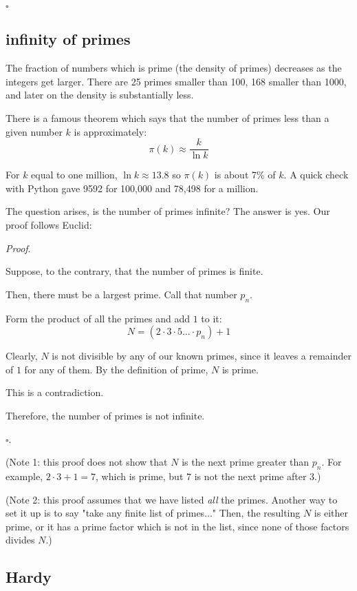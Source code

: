 \documentclass[11pt, oneside]{article}
\begin{document}
$\square$

\subsection*{infinity of primes}

The fraction of numbers which is prime (the density of primes) decreases as the integers get larger.  There are 25 primes smaller than 100, 168 smaller than 1000, and later on the density is substantially less.  

There is a famous theorem which says that the number of primes less than a given number $k$ is approximately:
\[ \pi(k) \approx \frac{k}{\ln k} \]  

For $k$ equal to one million, $\ln k \approx 13.8$ so $\pi(k)$ is about 7\% of $k$.  A quick check with Python gave 9592 for 100,000 and 78,498 for a million.

The question arises, is the number of primes infinite?  The answer is yes.  Our proof follows Euclid:

\emph{Proof}.

Suppose, to the contrary, that the number of primes is finite.  

Then, there must be a largest prime.  Call that number $p_n$.  

Form the product of all the primes and add $1$ to it:
\[ N = (2 \cdot 3 \cdot 5 \dots \cdot p_n)  + 1 \]

Clearly, $N$ is not divisible by any of our known primes, since it leaves a remainder of $1$ for any of them.  By the definition of prime, $N$ is prime.

This is a contradiction.

Therefore, the number of primes is not infinite.

$\square$.

(Note 1:  this proof does not show that $N$ is the next prime greater than $p_n$.  For example, $2 \cdot 3 + 1 = 7$, which is prime, but $7$ is not the next prime after $3$.)

(Note 2:  this proof assumes that we have listed \emph{all} the primes.  Another way to set it up is to say "take any finite list of primes..."  Then, the resulting $N$ is either prime, or it has a prime factor which is not in the list, since none of those factors divides $N$.)

\subsection*{Hardy}
\end{document}
